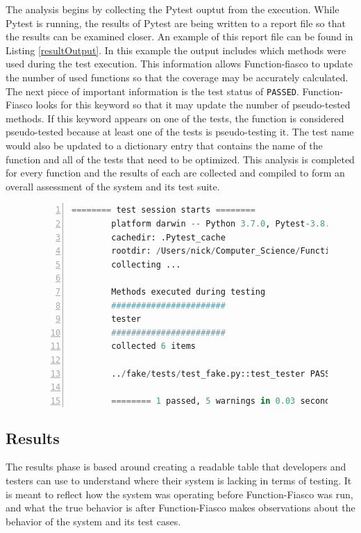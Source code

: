         The analysis begins by collecting the Pytest ouptut from the execution. While Pytest is running, the results of Pytest are being written to a report file so that the results can be examined closer. An example of this report file can be found in Listing \ref{resultOutput}. In this example the output includes which methods were used during the test execution. This information allows Function-fiasco to update the number of used functions so that the coverage may be accurately calculated. The next piece of important information is the test status of \texttt{PASSED}. Function-Fiasco looks for this keyword so that it may update the number of pseudo-tested methods. If this keyword appears on one of the tests, the function is considered pseudo-tested because at least one of the tests is pseudo-testing it. The test name would also be updated to a dictionary entry that contains the name of the function and all of the tests that need to be optimized. This analysis is completed for every function and the results of each are collected and compiled to form an overall assessment of the system and its test suite.

        \begin{figure}[t!]
        \begin{lstlisting}[language = Python, numbers = left, frame = single, caption = Execution of pytestFinder., label = resultOutput]
        ======== test session starts ========
        platform darwin -- Python 3.7.0, Pytest-3.8.0, py-1.6.0, pluggy-0.7.1 -- /usr/local/opt/python/bin/python3.7
        cachedir: .Pytest_cache
        rootdir: /Users/nick/Computer_Science/Function-Fiasco/ffiasco-git, inifile:
        collecting ...

        Methods executed during testing
        #######################
        tester
        #######################
        collected 6 items

        ../fake/tests/test_fake.py::test_tester PASSED [100%]

        ======== 1 passed, 5 warnings in 0.03 seconds ========
        \end{lstlisting}
        \end{figure}



  \subsection{Results}
      The results phase is based around creating a readable table that developers and testers can use to understand where their system is lacking in terms of testing. It is meant to reflect how the system was operating before Function-Fiasco was run, and what the true behavior is after Function-Fiasco makes observations about the behavior of the system and its test cases.

